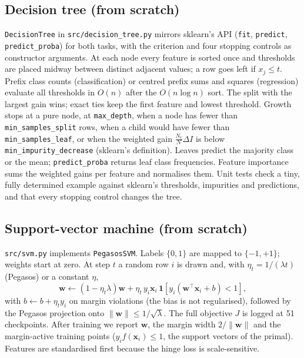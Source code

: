 \documentclass[10pt,twocolumn,a4paper]{article}
\begin{document}
\subsection{Decision tree (from scratch)}
\texttt{DecisionTree} in \texttt{src/decision\_tree.py} mirrors sklearn's
API (\texttt{fit}, \texttt{predict}, \texttt{predict\_proba}) for both tasks,
with the criterion and four stopping controls as constructor arguments.
At each node every feature is sorted once and
thresholds are placed midway between distinct adjacent values; a row goes left
if $x_j\le t$. Prefix class counts (classification) or centred prefix sums and
squares (regression) evaluate all thresholds in $O(n)$ after the
$O(n\log n)$ sort. The split with the largest gain wins; exact ties keep the
first feature and lowest threshold. Growth stops at a pure node, at
\texttt{max\_depth}, when a node has fewer than \texttt{min\_samples\_split}
rows, when a child would have fewer than \texttt{min\_samples\_leaf}, or when
the weighted gain $\tfrac{N_t}{N}\Delta I$ is below
\texttt{min\_impurity\_decrease} (sklearn's definition). Leaves predict the
majority class or the mean; \texttt{predict\_proba} returns leaf class
frequencies. Feature importance sums the weighted gains per feature and
normalises them. Unit tests check a tiny, fully determined example against
sklearn's thresholds, impurities and predictions, and that every stopping
control changes the tree.

\subsection{Support-vector machine (from scratch)}
\texttt{src/svm.py} implements \texttt{PegasosSVM}. Labels $\{0,1\}$ are mapped
to $\{-1,+1\}$; weights start at zero. At step $t$ a random row $i$ is drawn
and, with $\eta_t=1/(\lambda t)$ (Pegasos) or a constant $\eta$,
\begin{equation}
  \mathbf{w}\leftarrow(1-\eta_t\lambda)\mathbf{w}+
  \eta_t\,y_i\mathbf{x}_i\,\mathbf{1}[y_i(\mathbf{w}^\top\mathbf{x}_i+b)<1],
\end{equation}
with $b\leftarrow b+\eta_t y_i$ on margin violations (the bias is not
regularised), followed by the Pegasos projection onto
$\lVert\mathbf{w}\rVert\le1/\sqrt\lambda$. The full objective $J$ is logged
at 51 checkpoints. After training we report $\mathbf{w}$, the margin width
$2/\lVert\mathbf{w}\rVert$ and the margin-active training points
($y_if(\mathbf{x}_i)\le1$, the support vectors of the primal). Features are
standardised first because the hinge loss is scale-sensitive.
\end{document}
